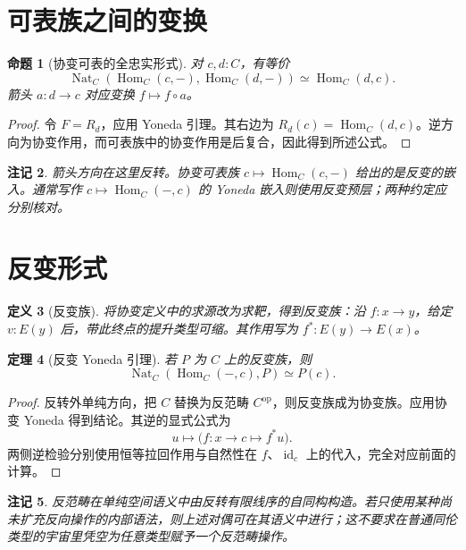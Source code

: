 \documentclass[12pt,oneside,openany,fontset=none]{ctexbook}
\theoremstyle{cn}
\newtheorem{definition}{定义}[chapter]
\newtheorem{proposition}[definition]{命题}
\newtheorem{theorem}[definition]{定理}
\newtheorem{remark}[definition]{注记}
\numberwithin{equation}{chapter}
\newcommand{\id}{\operatorname{id}}
\newcommand{\Hom}{\operatorname{Hom}}
\newcommand{\Nat}{\operatorname{Nat}}
\newcommand{\op}{\mathrm{op}}
\begin{document}
\section{可表族之间的变换}
\begin{proposition}[协变可表的全忠实形式]\label{prop:covariant-yoneda-ff}
对 $c,d:C$，有等价
\[
\Nat_C(\Hom_C(c,-),\Hom_C(d,-))
\simeq\Hom_C(d,c).
\]
箭头 $a:d\to c$ 对应变换 $f\mapsto f\circ a$。
\end{proposition}
\begin{proof}
令 $F=R_d$，应用 Yoneda 引理。其右边为 $R_d(c)=\Hom_C(d,c)$。逆方向为协变作用，而可表族中的协变作用是后复合，因此得到所述公式。
\end{proof}
\begin{remark}
箭头方向在这里反转。协变可表族 $c\mapsto\Hom_C(c,-)$ 给出的是反变的嵌入。通常写作 $c\mapsto\Hom_C(-,c)$ 的 Yoneda 嵌入则使用反变预层；两种约定应分别核对。
\end{remark}

\section{反变形式}
\begin{definition}[反变族]
将协变定义中的求源改为求靶，得到反变族：沿 $f:x\to y$，给定 $v:E(y)$ 后，带此终点的提升类型可缩。其作用写为 $f^*:E(y)\to E(x)$。
\end{definition}
\begin{theorem}[反变 Yoneda 引理]
若 $P$ 为 $C$ 上的反变族，则
\[
\Nat_C(\Hom_C(-,c),P)\simeq P(c).
\]
\end{theorem}
\begin{proof}
反转外单纯方向，把 $C$ 替换为反范畴 $C^{\op}$，则反变族成为协变族。应用协变 Yoneda 得到结论。其逆的显式公式为
\[
u\longmapsto\bigl(f:x\to c\longmapsto f^*u\bigr).
\]
两侧逆检验分别使用恒等拉回作用与自然性在 $f$、$\id_c$ 上的代入，完全对应前面的计算。
\end{proof}
\begin{remark}
反范畴在单纯空间语义中由反转有限线序的自同构构造。若只使用某种尚未扩充反向操作的内部语法，则上述对偶可在其语义中进行；这不要求在普通同伦类型的宇宙里凭空为任意类型赋予一个反范畴操作。
\end{remark}
\end{document}
